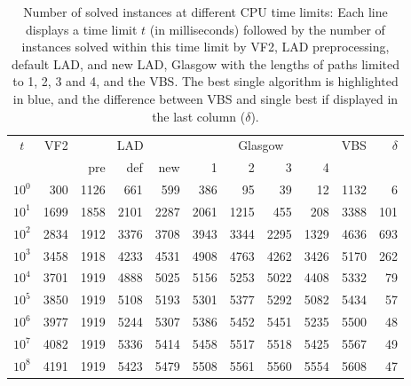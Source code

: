 \documentclass{llncs}
\begin{document}
\begin{table}[t]
\begin{center}
\begin{tabular}{|c||r||r|r|r||r|r|r|r||r|r|}
\hline
$t$ & VF2 & \multicolumn{3}{c||}{LAD} & \multicolumn{4}{c||}{Glasgow}& VBS & $\delta$\\
&&pre&def&new&1&2&3&4&&\\\hline
$10^0$ & 300 &  \cellcolor{blue!25}1126 & 661 & 599 & 386 & 95 & 39 & 12 & 1132 & 6\\\hline
$10^1$ & 1699 & 1858 & 2101 &  \cellcolor{blue!25}2287 & 2061 & 1215 & 455 & 208 & 3388 & 101\\\hline
$10^2$ & 2834 & 1912 & 3376 & 3708 &  \cellcolor{blue!25}3943 & 3344 & 2295 & 1329 & 4636 & 693\\\hline
$10^3$ & 3458 & 1918 & 4233 & 4531 &  \cellcolor{blue!25}4908 & 4763 & 4262 & 3426 & 5170 & 262\\\hline
$10^4$ & 3701 & 1919 & 4888 & 5025 & 5156 &  \cellcolor{blue!25}5253 & 5022 & 4408 & 5332 & 79\\\hline
$10^5$ & 3850 & 1919 & 5108 & 5193 & 5301 &  \cellcolor{blue!25}5377 & 5292 & 5082 & 5434 & 57\\\hline
$10^6$ & 3977 & 1919 & 5244 & 5307 & 5386 &  \cellcolor{blue!25}5452 & 5451 & 5235 & 5500 & 48\\\hline
$10^7$ & 4082 & 1919 & 5336 & 5414 & 5458 & 5517 &  \cellcolor{blue!25}5518 & 5425 & 5567 & 49\\\hline
$10^8$ & 4191 & 1919 & 5423 & 5479 & 5508 &  \cellcolor{blue!25}5561 & 5560 & 5554 & 5608 & 47\\\hline
\end{tabular}
\end{center}
\caption{Number of solved instances at different CPU time limits: Each line displays a time limit
$t$ (in milliseconds) followed by the number of instances solved within this time limit by VF2, LAD
preprocessing, default LAD, and new LAD, Glasgow with  the lengths of paths limited to 1, 2, 3 and
4, and the VBS. The best single algorithm is highlighted in blue, and the difference between VBS and
single best if displayed in the last column ($\delta$).\label{expTime}}
\end{table}
\end{document}
